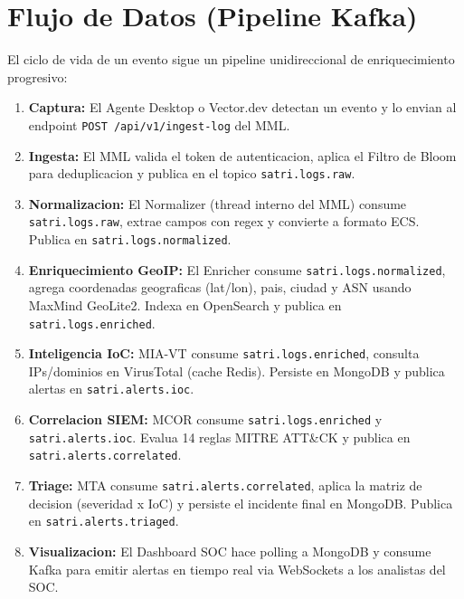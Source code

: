 \documentclass[12pt, a4paper]{report}
\begin{document}
\section{Flujo de Datos (Pipeline Kafka)}

El ciclo de vida de un evento sigue un pipeline unidireccional de enriquecimiento progresivo:

\begin{enumerate}[leftmargin=2em]
    \item \textbf{Captura:} El Agente Desktop o Vector.dev detectan un evento y lo envian al endpoint \texttt{POST /api/v1/ingest-log} del MML.
    \item \textbf{Ingesta:} El MML valida el token de autenticacion, aplica el Filtro de Bloom para deduplicacion y publica en el topico \texttt{satri.logs.raw}.
    \item \textbf{Normalizacion:} El Normalizer (thread interno del MML) consume \texttt{satri.logs.raw}, extrae campos con regex y convierte a formato ECS. Publica en \texttt{satri.logs.normalized}.
    \item \textbf{Enriquecimiento GeoIP:} El Enricher consume \texttt{satri.logs.normalized}, agrega coordenadas geograficas (lat/lon), pais, ciudad y ASN usando MaxMind GeoLite2. Indexa en OpenSearch y publica en \texttt{satri.logs.enriched}.
    \item \textbf{Inteligencia IoC:} MIA-VT consume \texttt{satri.logs.enriched}, consulta IPs/dominios en VirusTotal (cache Redis). Persiste en MongoDB y publica alertas en \texttt{satri.alerts.ioc}.
    \item \textbf{Correlacion SIEM:} MCOR consume \texttt{satri.logs.enriched} y \texttt{satri.alerts.ioc}. Evalua 14 reglas MITRE ATT\&CK y publica en \texttt{satri.alerts.correlated}.
    \item \textbf{Triage:} MTA consume \texttt{satri.alerts.correlated}, aplica la matriz de decision (severidad x IoC) y persiste el incidente final en MongoDB. Publica en \texttt{satri.alerts.triaged}.
    \item \textbf{Visualizacion:} El Dashboard SOC hace polling a MongoDB y consume Kafka para emitir alertas en tiempo real via WebSockets a los analistas del SOC.
\end{enumerate}
\end{document}
